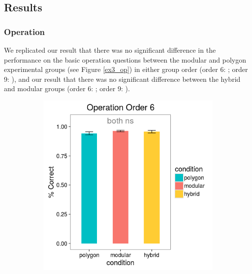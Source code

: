 \documentclass[11pt]{article}
\begin{document}
\subsection{Results}
\subsubsection{Operation}
We replicated our result that there was no significant difference in the performance on the basic operation questions between the modular and polygon experimental groups (see Figure \ref{ex3_op}) in either group order (order 6: ; order 9: ), and our result that there was no significant difference between the hybrid and modular groups (order 6: ; order 9: ).
\begin{figure}[H]
\centering
\begin{subfigure}[c]{0.4\textwidth}
\centering
\includegraphics[width=\textwidth]{figures/3/op_6_r.png}
\end{subfigure}
~
\begin{subfigure}[c]{0.4\textwidth}
\centering

\end{subfigure}
\end{figure}
\end{document}
